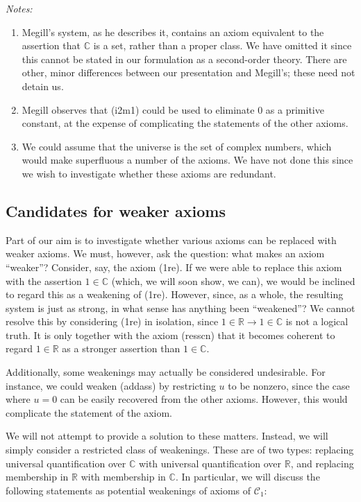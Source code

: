 \documentclass{article}
\newcommand\bC{\mathbb{C}}
\newcommand\bR{\mathbb{R}}
\newcommand\cC{\mathcal{C}}
\begin{document}
\textit{Notes:}
\begin{enumerate}
\item Megill's system, as he describes it, contains an axiom equivalent to the assertion that $\bC$ is a set, rather than a proper class. We have omitted it since this cannot be stated in our formulation as a second-order theory. There are other, minor differences between our presentation and Megill's; these need not detain us.
\item Megill observes that (i2m1) could be used to eliminate $0$ as a primitive constant, at the expense of complicating the statements of the other axioms.
\item We could assume that the universe is the set of complex numbers, which would make superfluous a number of the axioms. We have not done this since we wish to investigate whether these axioms are redundant.
\end{enumerate}

\subsection{Candidates for weaker axioms}

Part of our aim is to investigate whether various axioms can be replaced with weaker axioms. We must, however, ask the question: what makes an axiom ``weaker''? Consider, say, the axiom (1re). If we were able to replace this axiom with the assertion $1 \in \bC$ (which, we will soon show, we can), we would be inclined to regard this as a weakening of (1re). However, since, as a whole, the resulting system is just as strong, in what sense has anything been ``weakened''? We cannot resolve this by considering (1re) in isolation, since $1 \in \bR \rightarrow 1 \in \bC$ is not a logical truth. It is only together with the axiom (resscn) that it becomes coherent to regard $1 \in \bR$ as a stronger assertion than $1 \in \bC$.

Additionally, some weakenings may actually be considered undesirable. For instance, we could weaken (addass) by restricting $u$ to be nonzero, since the case where $u=0$ can be easily recovered from the other axioms. However, this would complicate the statement of the axiom.

We will not attempt to provide a solution to these matters. Instead, we will simply consider a restricted class of weakenings. These are of two types: replacing universal quantification over $\bC$ with universal quantification over $\bR$, and replacing membership in $\bR$ with membership in $\bC$. In particular, we will discuss the following statements as potential weakenings of axioms of $\cC_1$:
\end{document}
